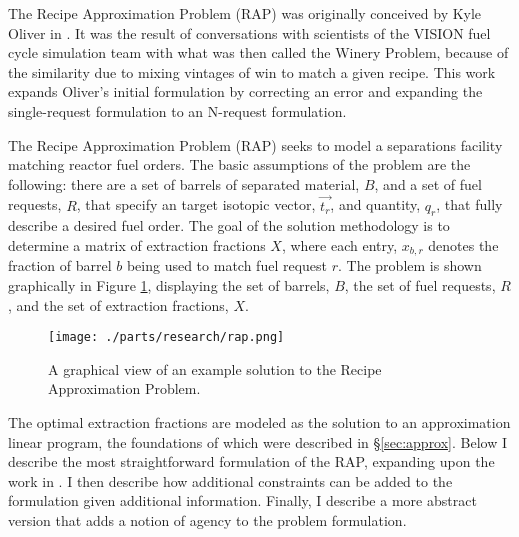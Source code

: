 The Recipe Approximation Problem (RAP) was originally conceived by Kyle Oliver
in \cite{oliver_geniusv2:_2009}. It was the result of conversations with
scientists of the VISION fuel cycle simulation team \cite{vision2009} with what
was then called the Winery Problem, because of the similarity due to mixing
vintages of win to match a given recipe. This work expands Oliver's initial
formulation by correcting an error and expanding the single-request formulation
to an N-request formulation.

The Recipe Approximation Problem (RAP) seeks to model a separations facility
matching reactor fuel orders. The basic assumptions of the problem are the
following: there are a set of barrels of separated material, $B$, and a set of
fuel requests, $R$, that specify an target isotopic vector, $\vec{t_{r}}$, and
quantity, $q_{r}$, that fully describe a desired fuel order. The goal of the
solution methodology is to determine a matrix of extraction fractions $X$, where
each entry, $x_{b,r}$ denotes the fraction of barrel $b$ being used to match
fuel request $r$. The problem is shown graphically in Figure \ref{fig:rap},
displaying the set of barrels, $B$, the set of fuel requests, $R$, and the set
of extraction fractions, $X$.

\begin{figure}[h]
  \begin{center}
    \texttt{[image: ./parts/research/rap.png]}
  \caption{A graphical view of an example solution to the Recipe Approximation 
           Problem.}
  \label{fig:rap}
  \end{center}
\end{figure}

The optimal extraction fractions are modeled as the solution to an
approximation linear program, the foundations of which were described in
\S\ref{sec:approx}. Below I describe the most straightforward formulation of 
the RAP, expanding upon the work in \cite{oliver_geniusv2:_2009}. I then
describe how additional constraints can be added to the formulation given
additional information. Finally, I describe a more abstract version that adds a
notion of agency to the problem formulation.
